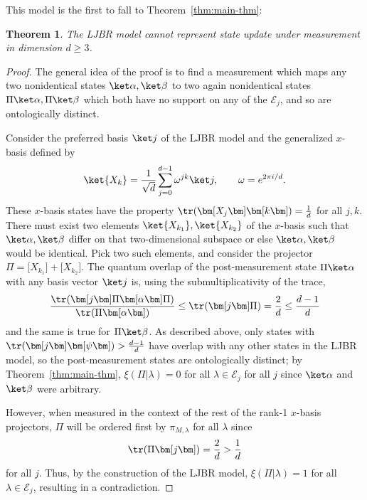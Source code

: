 \documentclass[%
 reprint,
superscriptaddress,
nofootinbib,
 amsmath,amssymb,
 prx, 
 accepted=2019-09-27,
]{quantumarticle}
\newtheorem{theorem}{Theorem}
\newcommand{\proj}[1]{{\bm[}#1{\bm]}}
\begin{document}
This model is the first to fall to Theorem~\ref{thm:main-thm}:
\begin{theorem}
  The LJBR model cannot represent state update under measurement in
  dimension $d\geq3$.
\end{theorem}
\begin{proof}
  The general idea of the proof is to find a measurement which maps
  any two nonidentical states $\ket\alpha,\ket\beta$ to two again
  nonidentical states $\Pi\ket\alpha,\Pi\ket\beta$ which both have no
  support on any of the $\mathcal E_j$, and so are ontologically
  distinct.

  Consider the preferred basis $\ket j$ of the LJBR model and the
  generalized $x$-basis defined by
  \begin{equation}
    \label{eq:12}
    \ket{X_k} = \frac{1}{\sqrt{d}}\sum_{j=0}^{d-1} \omega^{jk}\ket j,\qquad \omega=e^{2\pi i /d}.
  \end{equation}
  These $x$-basis states have the property
  $\tr(\proj{X_j}\proj k)=\frac{1}{d}$ for all $j,k$. There must exist
  two elements $\ket{X_{k_1}},\ket{X_{k_2}}$ of the $x$-basis such
  that $\ket\alpha,\ket\beta$ differ on that two-dimensional subspace
  or else $\ket\alpha,\ket\beta$ would be identical. Pick two such
  elements, and consider the projector
  $\Pi=\proj{X_{k_1}}+\proj{X_{k_2}}$. The quantum overlap of the
  post-measurement state $\Pi\ket\alpha$ with any basis vector
  $\ket j$ is, using the submultiplicativity of the trace,
  \begin{equation}
    \label{eq:13}
    \frac{\tr(\proj j\Pi\proj\alpha\Pi)}{\tr(\Pi\proj\alpha)}
    \leq\tr(\proj j\Pi) = \frac{2}{d} \leq \frac{d-1}{d}
  \end{equation}
  and the same is true for $\Pi\ket\beta$. As described above, only
  states with $\tr(\proj j\proj\psi)>\frac{d-1}{d}$ have overlap with
  any other states in the LJBR model, so the post-measurement states
  are ontologically distinct; by Theorem~\ref{thm:main-thm},
  $\xi(\Pi|\lambda) =0$ for all $\lambda\in\mathcal E_j$
  for all $j$ since $\ket\alpha$ and $\ket\beta$ were arbitrary.

  However, when measured in the context of the rest of the rank-1
  $x$-basis projectors, $\Pi$ will be ordered first by
  $\pi_{M,\lambda}$ for all $\lambda$ since
  \begin{equation}
    \label{eq:16}
    \tr(\Pi\proj j)=\frac{2}{d}>\frac{1}{d}
  \end{equation}
  for all $j$. Thus, by the construction of the LJBR model,
  $\xi(\Pi|\lambda)=1$ for all $\lambda\in\mathcal E_j$, resulting in
  a contradiction.
\end{proof}
\end{document}
